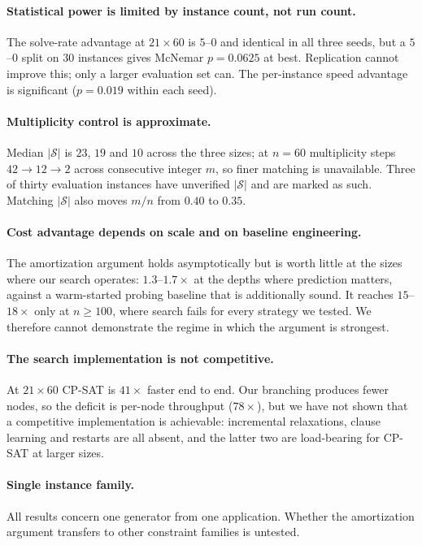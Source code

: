 \documentclass[11pt]{article}
\newcommand{\SOL}{\mathcal{S}}
\begin{document}
\paragraph{Statistical power is limited by instance count, not run count.} The solve-rate advantage at $21\times60$ is $5$--$0$ and identical in all three seeds, but a $5$--$0$ split on $30$ instances gives McNemar $p=0.0625$ at best. Replication cannot improve this; only a larger evaluation set can. The per-instance speed advantage is significant ($p=0.019$ within each seed).

\paragraph{Multiplicity control is approximate.} Median $|\SOL|$ is $23$, $19$ and $10$ across the three sizes; at $n=60$ multiplicity steps $42\to12\to2$ across consecutive integer $m$, so finer matching is unavailable. Three of thirty evaluation instances have unverified $|\SOL|$ and are marked as such. Matching $|\SOL|$ also moves $m/n$ from $0.40$ to $0.35$.

\paragraph{Cost advantage depends on scale and on baseline engineering.} The amortization argument holds asymptotically but is worth little at the sizes where our search operates: $1.3$--$1.7\times$ at the depths where prediction matters, against a warm-started probing baseline that is additionally sound. It reaches $15$--$18\times$ only at $n\ge 100$, where search fails for every strategy we tested. We therefore cannot demonstrate the regime in which the argument is strongest.

\paragraph{The search implementation is not competitive.} At $21\times60$ CP-SAT is $41\times$ faster end to end. Our branching produces fewer nodes, so the deficit is per-node throughput ($78\times$), but we have not shown that a competitive implementation is achievable: incremental relaxations, clause learning and restarts are all absent, and the latter two are load-bearing for CP-SAT at larger sizes.

\paragraph{Single instance family.} All results concern one generator from one application. Whether the amortization argument transfers to other constraint families is untested.
\end{document}
